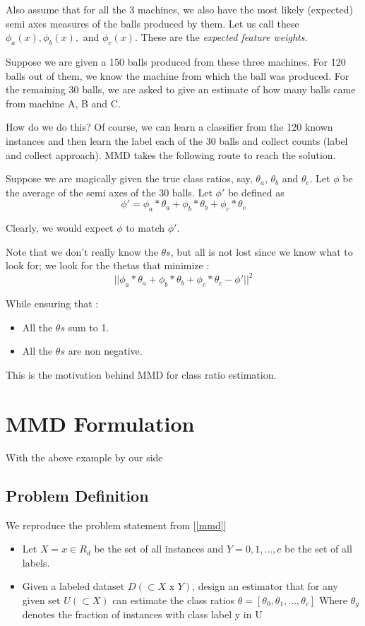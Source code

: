 Also assume that for all the 3 machines, we also have the most likely (expected) semi axes measures of the balls produced by them.
Let us call these $\phi_a(x), \phi_b(x),$ and $\phi_c(x)$. These are the \emph{expected feature weights}.

Suppose we are given a 150 balls produced from these three machines. For 120 balls out of them, we know the machine 
from which the ball was produced. For the remaining 30 balls, we are asked to give an estimate of how many balls came 
from machine A, B and C. 

How do we do this? Of course, we can learn a classifier from the 120 known instances and then learn the label each of 
the 30 balls and collect counts (label and collect approach). MMD takes the following route to reach the solution.

Suppose we are magically given the true class ratios, say, $\theta_a$, $\theta_b$ and $\theta_c$. Let  
$\phi$ be the average of the semi axes of the 30 balls. Let $\phi'$ be defined as 
\begin{equation}
 \phi' = \phi_a * \theta_a + \phi_b * \theta_b + \phi_c * \theta_c 
\end{equation}

Clearly, we would expect $\phi$ to match $\phi'$. 

Note that we don't really know the $\theta s$, but all is not lost since we know what to look for; 
we look for the thetas that minimize : 
\begin{equation}
 ||\phi_a * \theta_a + \phi_b * \theta_b + \phi_c * \theta_c  - \phi'||^2
\end{equation}

While ensuring that  :
\begin{itemize}
 \item All the $\theta s$ sum to 1.
 \item All the $\theta s$ are non negative.
\end{itemize}

This is the motivation behind MMD for class ratio estimation.
\section{MMD Formulation}

With the above example by our side
\subsection{Problem Definition}
We reproduce the problem statement from [\ref{mmd}]
 \begin{itemize}
  \item  Let $X = {x \in R_d }$ be the set of all instances and 
  $Y = {0, 1, . . . , c}$ be the  set of all labels.
 \medskip
\item Given a labeled dataset $D(\subset X\text{ x } Y)$, design an estimator that for any given set
$U (\subset X )$ can estimate the class ratios $\theta = [\theta_0 , \theta_1 , . . . , \theta_c ]$
Where  $\theta_y$ denotes the fraction of instances with class label y in U 
 \end{itemize}

